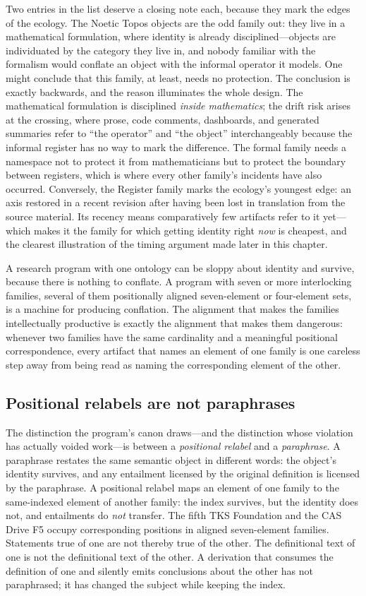 Two entries in the list deserve a closing note each, because they mark
the edges of the ecology. The Noetic Topos objects are the odd family
out: they live in a mathematical formulation, where identity is already
disciplined---objects are individuated by the category they live in, and
nobody familiar with the formalism would conflate an object with the
informal operator it models. One might conclude that this family, at
least, needs no protection. The conclusion is exactly backwards, and the
reason illuminates the whole design. The mathematical formulation is
disciplined \emph{inside mathematics}; the drift risk arises at the
crossing, where prose, code comments, dashboards, and generated
summaries refer to ``the operator'' and ``the object'' interchangeably
because the informal register has no way to mark the difference. The
formal family needs a namespace not to protect it from mathematicians
but to protect the boundary between registers, which is where every
other family's incidents have also occurred. Conversely, the Register
family marks the ecology's youngest edge: an axis restored in a recent
revision after having been lost in translation from the source
material. Its recency means comparatively few artifacts refer to it
yet---which makes it the family for which getting identity right
\emph{now} is cheapest, and the clearest illustration of the timing
argument made later in this chapter.

A research program with one ontology can be sloppy about identity and
survive, because there is nothing to conflate. A program with seven or more
interlocking families, several of them positionally aligned seven-element
or four-element sets, is a machine for producing conflation. The alignment
that makes the families intellectually productive is exactly the alignment
that makes them dangerous: whenever two families have the same cardinality
and a meaningful positional correspondence, every artifact that names an
element of one family is one careless step away from being read as naming
the corresponding element of the other.

\subsection{Positional relabels are not paraphrases}\label{ch01:relabel}

The distinction the program's canon draws---and the distinction whose
violation has actually voided work---is between a \emph{positional relabel}
and a \emph{paraphrase}. A paraphrase restates the same semantic object in
different words: the object's identity survives, and any entailment
licensed by the original definition is licensed by the paraphrase. A
positional relabel maps an element of one family to the same-indexed
element of another family: the index survives, but the identity does not,
and entailments do \emph{not} transfer. The fifth TKS Foundation and the
CAS Drive F5 occupy corresponding positions in aligned seven-element
families. Statements true of one are not thereby true of the other. The
definitional text of one is not the definitional text of the other. A
derivation that consumes the definition of one and silently emits
conclusions about the other has not paraphrased; it has changed the
subject while keeping the index.

